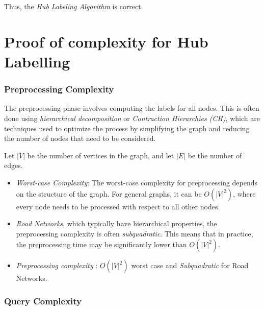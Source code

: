 \begin{appendices}
	Thus, the \textit{Hub Labeling Algorithm} is correct.
	




\section{Proof of complexity for Hub Labelling}\label{appendix:Hub Labelling:Complexity}

	\subsubsection{Preprocessing Complexity}
	
	The preprocessing phase involves computing the labels for all nodes. This is often done using \textit{hierarchical decomposition} or \textit{Contraction Hierarchies (CH)}, which are techniques used to optimize the process by simplifying the graph and reducing the number of nodes that need to be considered.
	
	
	Let $ |V| $ be the number of vertices in the graph, and let $|E| $ be the number of edges.
	
	\begin{itemize}

	\item \textit{Worst-case Complexity}: 
	The worst-case complexity for preprocessing depends on the structure of the graph. For general graphs, it can be $ O(|V|^2) $, where every node needs to be processed with respect to all other nodes. 
	
	\item \textit{Road Networks}, which typically have hierarchical properties, the preprocessing complexity is often \textit{subquadratic}. This means that in practice, the preprocessing time may be significantly lower than $ O(|V|^2) $.
	
	\item \textit{Preprocessing complexity} : $ O(|V|^2) $ worst case and \textit{Subquadratic} for Road Networks.
	
		\end{itemize}
	\subsubsection{Query Complexity}
	

\end{appendices}
